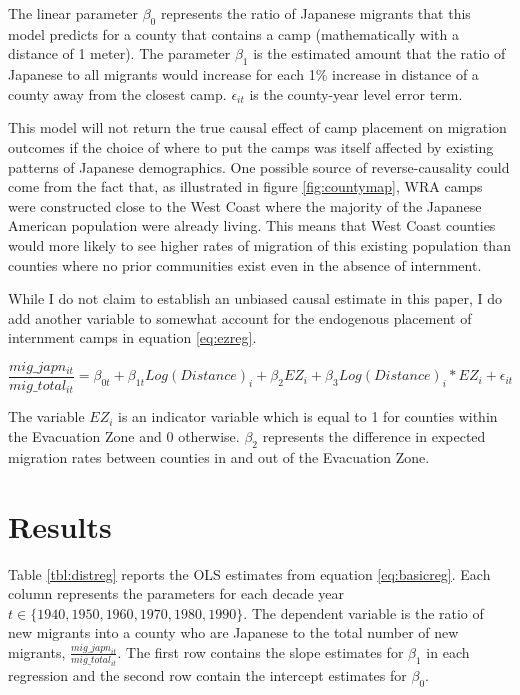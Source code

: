 \documentclass[12pt]{article}
\begin{document}
The linear parameter $\beta_0$ represents the ratio of Japanese migrants that this model predicts for a county that contains a camp (mathematically with a distance of 1 meter).
The parameter $\beta_1$ is the estimated amount that the ratio of Japanese to all migrants would increase for each 1\% increase in distance of a county away from the closest camp.
$\epsilon_{it}$ is the county-year level error term.

This model will not return the true causal effect of camp placement on migration outcomes if the choice of where to put the camps was itself affected by existing patterns of Japanese demographics.
One possible source of reverse-causality could come from the fact that, as illustrated in figure \ref{fig:countymap},
WRA camps were constructed close to the West Coast where the majority of the Japanese American population were already living. 
This means that West Coast counties would more likely to see higher rates of migration of this existing population than counties where no prior communities exist even in the absence of internment. 

While I do not claim to establish an unbiased causal estimate in this paper, 
I do add another variable to somewhat account for the endogenous placement of internment camps in equation \ref{eq:ezreg}.

\begin{equation}\label{eq:ezreg}
    \frac{mig\_japn_{it}}{mig\_total_{it}} = \beta_{0t} + \beta_{1t} Log(Distance)_i + \beta_2 EZ_i + \beta_3 Log(Distance)_i * EZ_i +  \epsilon_{it}
\end{equation}

The variable $EZ_i$ is an indicator variable which is equal to 1 for counties within the Evacuation Zone and 0 otherwise.
$\beta_2$ represents the difference in expected migration rates between counties in and out of the Evacuation Zone.


\section{Results}\label{results}


Table \ref{tbl:distreg} reports the OLS estimates from equation \ref{eq:basicreg}.
Each column represents the parameters for each decade year $t \in \{1940, 1950, 1960, 1970, 1980, 1990\}$.
The dependent variable is the ratio of new migrants into a county who are Japanese to the total number of new migrants, $\frac{mig\_japn_{it}}{mig\_total_{it}}$.
The first row contains the slope estimates for $\beta_1$ in each regression
and the second row contain the intercept estimates for $\beta_0$.
\end{document}
